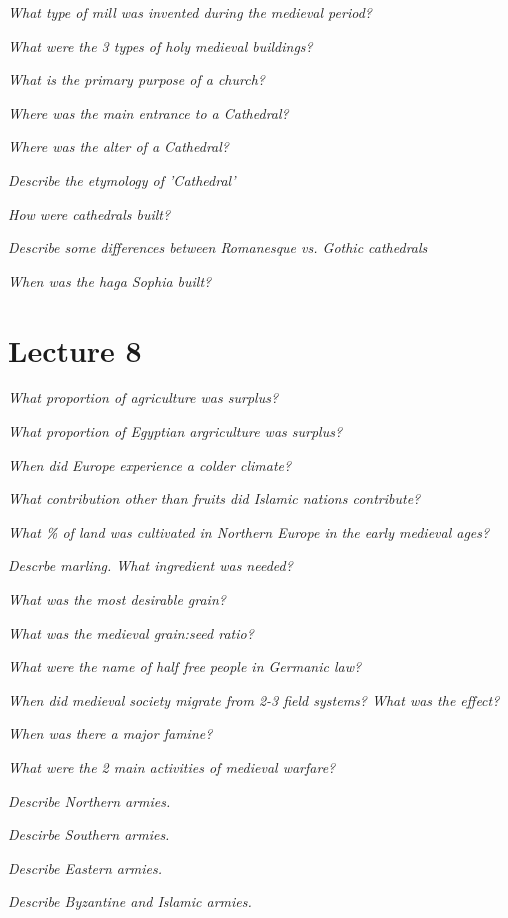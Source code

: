 \documentclass[12pt]{article}
\begin{document}
\textit{What type of mill was invented during the medieval period?}

\textit{What were the 3 types of holy medieval buildings?}

\textit{What is the primary purpose of a church?}

\textit{Where was the main entrance to a Cathedral?}

\textit{Where was the alter of a Cathedral?}

\textit{Describe the etymology of 'Cathedral'}

\textit{How were cathedrals built?}

\textit{Describe some differences between Romanesque vs. Gothic cathedrals}

\textit{When was the haga Sophia built?}

\section*{Lecture 8}

\textit{What proportion of agriculture was surplus?}

\textit{What proportion of Egyptian argriculture was surplus?}

\textit{When did Europe experience a colder climate?}

\textit{What contribution other than fruits did Islamic nations contribute?}

\textit{What \% of land was cultivated in Northern Europe in the early medieval ages?}

\textit{Descrbe marling. What ingredient was needed?}

\textit{What was the most desirable grain?}

\textit{What was the medieval grain:seed ratio?}

\textit{What were the name of half free people in Germanic law?}

\textit{When did medieval society migrate from 2-3 field systems? What was the effect?}

\textit{When was there a major famine?}

\textit{What were the 2 main activities of medieval warfare?}

\textit{Describe Northern armies.}

\textit{Descirbe Southern armies.}

\textit{Describe Eastern armies.}

\textit{Describe Byzantine and Islamic armies.}
\end{document}

